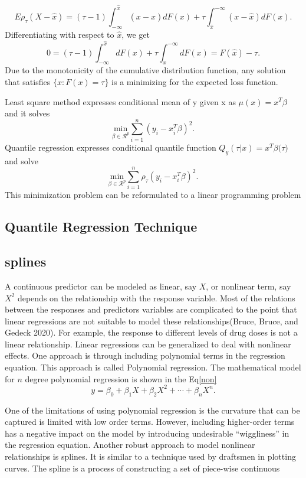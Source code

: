 \documentclass[
  12pt,
]{article}
\begin{document}
\[E\rho_{\tau}(X-\hat{x})=(\tau-1)\int_{-\infty}^{\hat{x}} (x-\hat{x})dF(x)+\tau\int_{\hat{x}}^{-\infty} (x-\hat{x})dF(x).\]
Differentiating with respect to \(\hat{x}\), we get
\[ 0  =(\tau-1)\int_{-\infty}^{\hat{x}} dF(x)+\tau\int_{\hat{x}}^{-\infty} dF(x)
=F(\hat{x})-\tau.\]
Due to the monotonicity of the cumulative distribution function, any solution that satisfies \(\{x:F(x)=\tau \}\) is a minimizing for the expected loss function.

Least square method expresses conditional mean of y given x as \(\mu(x)=x^T\beta\) and it solves \[ \underset{\beta\in \mathcal{R}^p}{\text{min}}\sum_{i=1}^n(y_i- x_i^T\beta)^2.\] Quantile regression expresses conditional quantile function \(Q_y(\tau|x)=x^T \beta ({\tau)}\) and solve \[ \underset{\beta\in \mathcal{R}^p}{\text{min}}\sum_{i=1}^n\rho_{\tau}(y_i- x_i^T\beta)^2.\]This minimization problem can be reformulated to a linear programming problem

\subsection{Quantile Regression Technique }

\subsection{splines}

A continuous predictor can be modeled as linear, say \(X\), or nonlinear term, say \(X^2\) depends on the relationship with the response variable. Most of the relations between the responses and predictors variables are complicated to the point that linear regressions are not suitable to model these relationships(Bruce, Bruce, and Gedeck 2020). For example, the response to different levels of drug doses is not a linear relationship. Linear regressions can be generalized to deal with nonlinear effects. One approach is through including polynomial terms in the regression equation. This approach is called Polynomial regression. The mathematical model for \(n\) degree polynomial regression is shown in the Eq\eqref{non}
\begin{equation}\label{non}
 y=\beta_0+\beta_1 X+\beta_2 X^2+\cdots+\beta_nX^n.
 \end{equation}

One of the limitations of using polynomial regression is the curvature that can be captured is limited with low order terms. However, including higher-order terms has a negative impact on the model by introducing undesirable ``wiggliness'' in the regression equation. Another robust approach to model nonlinear relationships is splines. It is similar to a technique used by draftsmen in plotting curves. The spline is a process of constructing a set of piece-wise continuous
\end{document}
